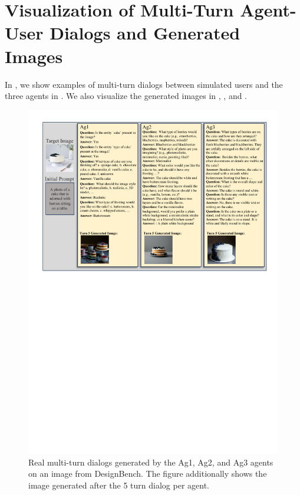\section{Visualization of Multi-Turn Agent-User Dialogs and Generated Images}
In , we show examples of multi-turn dialogs between simulated users and the three agents in . We also visualize the generated images in , ,  and .
\begin{figure}
    \centering
    \includegraphics[width=\linewidth]{figures/dialog.pdf}
    \caption{Real multi-turn dialogs generated by the Ag1, Ag2, and Ag3 agents on an image from DesignBench. The figure additionally shows the image generated after the 5 turn dialog per agent.}
    \label{fig:dialog}
\end{figure}

